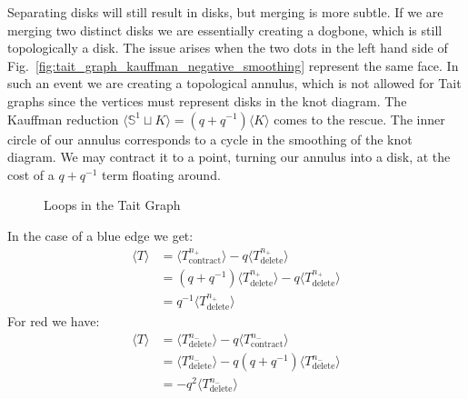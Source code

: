 \documentclass{article}
\theoremstyle{plain}
\begin{document}
        Separating disks will still result in disks, but
        merging is more subtle. If we are merging two distinct disks we are
        essentially creating a dogbone, which is still topologically a
        disk. The issue arises when the two dots in the left hand side of
        Fig.~\ref{fig:tait_graph_kauffman_negative_smoothing} represent
        the same face. In such an event we are creating a topological
        annulus, which is not allowed for Tait graphs since the vertices
        must represent disks in the knot diagram. The Kauffman reduction
        $\langle{\mathbb{S}^{1}\sqcup{K}}\rangle=(q+q^{-1})\langle{K}\rangle$
        comes to the rescue. The inner circle of our annulus corresponds to
        a cycle in the smoothing of the knot diagram. We may contract it to
        a point, turning our annulus into a disk, at the cost of a
        $q+q^{-1}$ term floating around.
        \begin{figure}
            \centering
            \caption{Loops in the Tait Graph}
            \label{fig:tait_graph_reidemeister_1_dual}
        \end{figure}
        \par\hfill\par
        In the case of a blue edge we get:
        \begin{align}
            \langle{T}\rangle
            &=\langle{T^{n_{+}}_{\textrm{contract}}}\rangle
            -q\langle{T^{n_{+}}_{\textrm{delete}}}\rangle\\
            &=(q+q^{-1})\langle{T^{n_{+}}_{\textrm{delete}}}\rangle
            -q\langle{T^{n_{+}}_{\textrm{delete}}}\rangle\\
            &=q^{-1}\langle{T^{n_{+}}_{\textrm{delete}}}\rangle
        \end{align}
        For red we have:
        \begin{align}
            \label{eqn:tait_graph_kauffman_bracket_negative_loop_reduction}
            \langle{T}\rangle
            &=\langle{{T^{n_{-}}_{\textrm{delete}}}}\rangle
            -q\langle{{T^{n_{-}}_{\textrm{contract}}}}\rangle\\
            &=\langle{{T^{n_{-}}_{\textrm{delete}}}}\rangle
            -q(q+q^{-1})\langle{{T^{n_{-}}_{\textrm{delete}}}}\rangle\\
            &=-q^{2}\langle{{T^{n_{-}}_{\textrm{delete}}}}\rangle
        \end{align}
\end{document}
